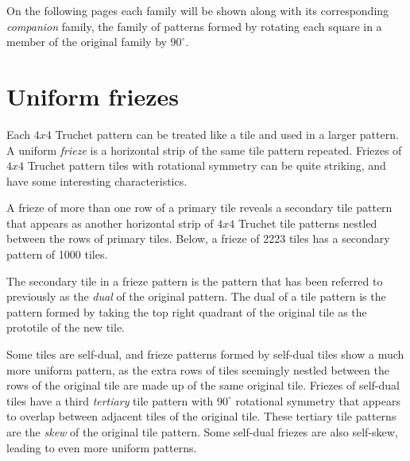 \documentclass{tufte-book}
\begin{document}
\vspace{0.5cm}

\noindent
On the following pages each family will be shown along with its corresponding \textit{companion} family, the family of patterns formed by rotating each square in a member of the original family by $90^{\circ}$. 

\newpage


% 
% 
\chapter{Uniform friezes}

\noindent
Each $4x4$ Truchet pattern can be treated like a tile and used in a larger pattern. A uniform \textit{frieze} is a horizontal strip of the same tile pattern repeated. Friezes of $4x4$ Truchet pattern tiles with rotational symmetry can be quite striking, and have some interesting characteristics. 

\vspace{0.5cm}
\noindent
A frieze of more than one row of a primary tile reveals a secondary tile pattern that appears as another horizontal strip of $4x4$ Truchet tile patterns nestled between the rows of primary tiles. Below, a frieze of 2223 tiles has a secondary pattern of 1000 tiles.
\,

\vspace{0.5cm}


\vspace{0.5cm}
\noindent
The secondary tile in a frieze pattern is the pattern that has been referred to previously as the \textit{dual} of the original pattern. The dual of a tile pattern is the pattern formed by taking the top right quadrant of the original tile as the prototile of the new tile.

\vspace{0.5cm}
\noindent
Some tiles are self-dual, and frieze patterns formed by self-dual tiles show a much more uniform pattern, as the extra rows of tiles seemingly nestled between the rows of the original tile are made up of the same original tile. Friezes of self-dual tiles have a third \textit{tertiary} tile pattern with $90^{\circ}$ rotational symmetry that appears to overlap between adjacent tiles of the original tile. These tertiary tile patterns are the \textit{skew} of the original tile pattern. Some self-dual friezes are also self-skew, leading to even more uniform patterns.
\end{document}
